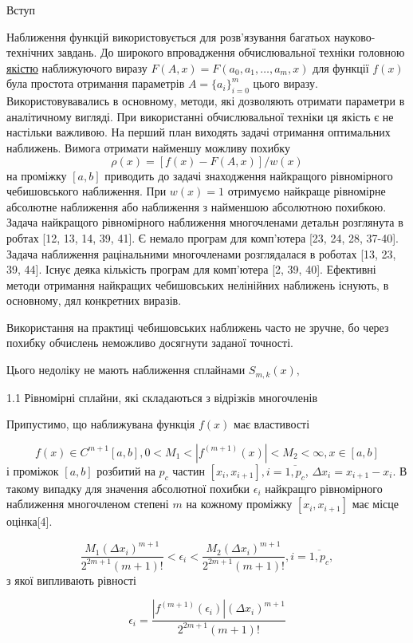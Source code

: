 \documentclass[ukrainian,14pt]{extarticle}
\begin{document}
\newpage

Вступ

Наближення функцій використовується для розв'язування багатьох науково-технічних завдань.
До широкого впровадження обчислювальної техніки головною \underline{якістю} наближуючого виразу 
$F(A, x) = F(a_0, a_1, \ldots, a_m, x)$ для функції $f(x)$ була простота отримання параметрів $A=\{a_i\}_{i=0}^m$ цього виразу. Використовувавались в основному, методи, які дозволяють отримати параметри в аналітичному вигляді. При використанні обчислювальної техніки ця якість є не настільки важливою. На перший план виходять задачі отримання оптимальних наближень. Вимога отримати найменшу можливу похибку
$$\rho(x) = [f(x) - F(A, x)] / w(x)$$
на проміжку $[a, b]$ приводить до задачі знаходження найкращого рівномірного чебишовського наближення. При $w(x) = 1$ отримуємо найкраще рівномірне абсолютне наближення або наближення з найменшою абсолютною похибкою.
Задача найкращого рівномірного наближення многочленами детальн розглянута в робтах [12, 13, 14, 39, 41]. Є немало програм для комп'ютера [23, 24, 28, 37-40]. Задача наближення рацінальними многочленами розглядалася в роботах [13, 23, 39, 44]. Існує деяка кількість програм для комп'ютера [2, 39, 40]. 
Ефективні методи отримання найкращих чебишовських нелінійних наближень існують, в основному, дял конкретних виразів.

Використання на практиці чебишовських наближень часто не зручне, бо через похибку обчислень неможливо досягнути заданої точності.

Цього недоліку не мають наближення сплайнами $S_{m, k}(x),$


1.1 Рівномірні сплайни, які складаються з відрізків многочленів

Припустимо, що наближувана функція $f(x)$ має властивості 

$$ f(x) \in C^{m+1}[a,b], 0 < M_1 < |f^{(m+1)}(x)| < M_2 < \infty, x \in [a, b]$$
і проміжок $[a, b]$ розбитий на $p_c$ частин $[x_i, x_{i+1}], i=\overline{1, p_c}$,
$\Delta x_i = x_{i+1} - x_i$. В такому випадку для значення абсолютної похибки $\epsilon_i$ найкращго рівномірного наближення многочленом степені $m$ на кожному проміжку $[x_i, x_{i+1}]$ має місце оцінка[4].

$$\frac {M_1(\Delta x_i)^{m+1}} {2^{2m+1} (m+1)!} < \epsilon_i < \frac {M_2(\Delta x_i)^{m+1}} {2^{2m+1} (m+1)!}, i = \overline{1, p_c} ,$$
з якої випливають рівності

$$\epsilon_i = \frac {|f^{(m+1)}(\epsilon_i)|(\Delta x_i)^{m+1}} {2^{2m+1} (m+1)!}$$
\end{document}
